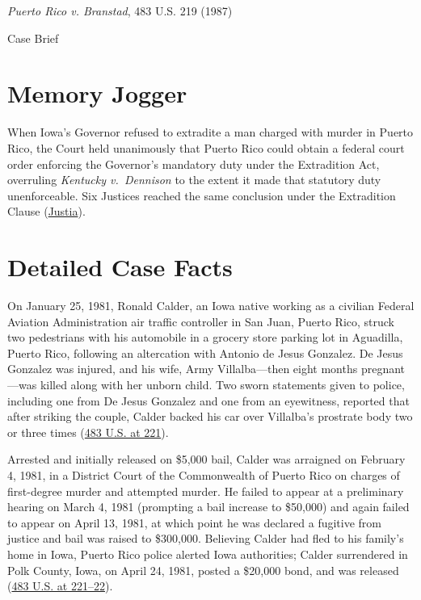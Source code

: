 \documentclass[12pt]{article}
\begin{document}
\begin{center}
{\LARGE \textit{Puerto Rico v. Branstad}, 483 U.S. 219 (1987)\par}
\vspace{0.8em}
{\large Case Brief\par}
\end{center}
\vspace{1em}

\section{Memory Jogger}
When Iowa's Governor refused to extradite a man charged with murder in Puerto Rico, the Court held unanimously that Puerto Rico could obtain a federal court order enforcing the Governor's mandatory duty under the Extradition Act, overruling \textit{Kentucky v.\ Dennison} to the extent it made that statutory duty unenforceable. Six Justices reached the same conclusion under the Extradition Clause (\href{https://supreme.justia.com/cases/federal/us/483/219/}{Justia}).

\section{Detailed Case Facts}
On January 25, 1981, Ronald Calder, an Iowa native working as a civilian Federal Aviation Administration air traffic controller in San Juan, Puerto Rico, struck two pedestrians with his automobile in a grocery store parking lot in Aguadilla, Puerto Rico, following an altercation with Antonio de Jesus Gonzalez. De Jesus Gonzalez was injured, and his wife, Army Villalba---then eight months pregnant---was killed along with her unborn child. Two sworn statements given to police, including one from De Jesus Gonzalez and one from an eyewitness, reported that after striking the couple, Calder backed his car over Villalba's prostrate body two or three times (\href{https://supreme.justia.com/cases/federal/us/483/219/}{483 U.S. at 221}).

Arrested and initially released on \$5,000 bail, Calder was arraigned on February 4, 1981, in a District Court of the Commonwealth of Puerto Rico on charges of first-degree murder and attempted murder. He failed to appear at a preliminary hearing on March 4, 1981 (prompting a bail increase to \$50,000) and again failed to appear on April 13, 1981, at which point he was declared a fugitive from justice and bail was raised to \$300,000. Believing Calder had fled to his family's home in Iowa, Puerto Rico police alerted Iowa authorities; Calder surrendered in Polk County, Iowa, on April 24, 1981, posted a \$20,000 bond, and was released (\href{https://supreme.justia.com/cases/federal/us/483/219/}{483 U.S. at 221--22}).
\end{document}
